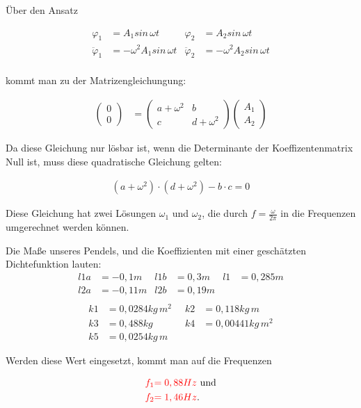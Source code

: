 \documentclass[a3paper, 12pt, landscape]{article}
\newcommand{\mathematik}{\begin{equation*}\begin{aligned}}
\newcommand{\mathematikstop}{\end{aligned}\end{equation*}}
\renewcommand{\phi}{\varphi} %
\newcommand{\phidd}{\ddot{\phi}}  %
\begin{document}
\begin{multicols}{2}
\columnbreak
Über den Ansatz

\mathematik
\phi_1 &= A_1 sin\, \omega t
& \phi_2 &= A_2 sin\, \omega t \\
\phidd_1 &= - \omega^2 A_1 sin\, \omega t
& \phidd_2 &= - \omega^2 A_2 sin\, \omega t \\
\mathematikstop

kommt man zu der Matrizengleichungung:

\mathematik
\begin{pmatrix}0 \\ 0\end{pmatrix} &=
\begin{pmatrix}
a+\omega^2 & b\\
c & d+\omega^2
\end{pmatrix}
\begin{pmatrix}A_1 \\ A_2\end{pmatrix}
\mathematikstop

Da diese Gleichung nur lösbar ist, wenn die Determinante der Koeffizentenmatrix Null ist, muss diese quadratische Gleichung gelten:

\mathematik
(a + \omega^2) \cdot (d + \omega^2) - b \cdot c = 0
\mathematikstop

Diese Gleichung hat zwei Lösungen $\omega_1$ und $\omega_2$, die durch $f=\frac{\omega}{2\pi}$ in die Frequenzen umgerechnet werden können.

Die Maße unseres Pendels, und die Koeffizienten mit einer geschätzten Dichtefunktion lauten:
\mathematik
l1a &= -0,1m & l1b &= 0,3m & l1 &= 0,285m \\
l2a &= -0,11m & l2b &= 0,19m \\
\mathematikstop
\mathematik
k1 &= 0,0284 kg\,m^2 \;\; & k2 &= 0,118 kg\,m \\
k3 &= 0,488 kg & k4 &= 0,00441kg\,m^2 \\
k5 &= 0,0254kg\,m
\mathematikstop

Werden diese Wert eingesetzt, kommt man auf die Frequenzen

\mathematik
\textcolor{red}{f_1} &\textcolor{red}{= 0,88Hz} \text{ und}\\
\textcolor{red}{f_2} &\textcolor{red}{= 1,46 Hz}.
\mathematikstop

\end{multicols}
\end{document}
